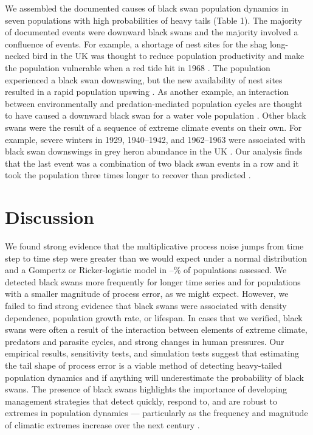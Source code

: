 We assembled the documented causes of black swan population dynamics in seven
populations with high probabilities of heavy tails (Table 1). The majority of
documented events were downward black swans and the majority involved
a confluence of events. For example, a shortage of nest sites for the shag
long-necked bird in the UK was thought to reduce population productivity and
make the population vulnerable when a red tide hit in 1968 \citep{potts1980}.
The population experienced a black swan downswing, but the new availability of
nest sites resulted in a rapid population upswing \citep{potts1980}. As
another example, an interaction between environmentally and predation-mediated
population cycles are thought to have caused a downward black swan for a water
vole population \citep{saucy1994}. Other black swans were the result of
a sequence of extreme climate events on their own. For example, severe winters
in 1929, 1940--1942, and 1962--1963 were associated with black swan downswings
in grey heron abundance in the UK \citep{stafford1971}. Our analysis finds
that the last event was a combination of two black swan events in a row and it
took the population three times longer to recover than predicted
\citep{stafford1971}.

\section{Discussion}

We found strong evidence that the multiplicative process noise jumps from time
step to time step were greater than we would expect under a normal distribution
and a Gompertz or Ricker-logistic model in \overallMinPerc--\overallMaxPerc\%
of populations assessed. We detected black swans more frequently for longer
time series and for populations with a smaller magnitude of process error, as
we might expect. However, we failed to find strong evidence that black swans
were associated with density dependence, population growth rate, or lifespan.
In cases that we verified, black swans were often a result of the interaction
between elements of extreme climate, predators and parasite cycles, and strong
changes in human pressures. Our empirical results, sensitivity tests, and
simulation tests suggest that estimating the tail shape of process error is
a viable method of detecting heavy-tailed population dynamics and if anything
will underestimate the probability of black swans. The presence of black swans
highlights the importance of developing management strategies that detect
quickly, respond to, and are robust to extremes in population dynamics ---
particularly as the frequency and magnitude of climatic extremes increase over
the next century \citep{easterling2000,ipcc2012}.

